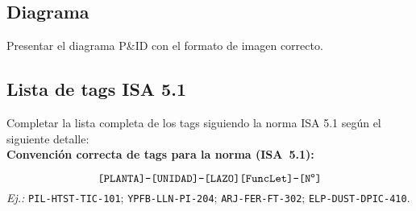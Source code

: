 \documentclass[12pt,letterpaper]{report}
\begin{document}
	\subsection{Diagrama}
	Presentar el diagrama P\&ID con el formato de imagen correcto.
	\subsection{Lista de tags ISA 5.1}
	Completar la lista completa de los tags siguiendo la norma ISA 5.1 según el siguiente detalle: \\
	\noindent\textbf{Convención correcta de tags para la norma (ISA~5.1):}
	\begin{center}
		\[
		\texttt{[PLANTA]-[UNIDAD]-[LAZO][FuncLet]-[N\textsuperscript{o}]}
		\]
		\emph{Ej.:} \texttt{PIL-HTST-TIC-101}; \texttt{YPFB-LLN-PI-204}; \texttt{ARJ-FER-FT-302}; \texttt{ELP-DUST-DPIC-410}.
	\end{center}
\end{document}
